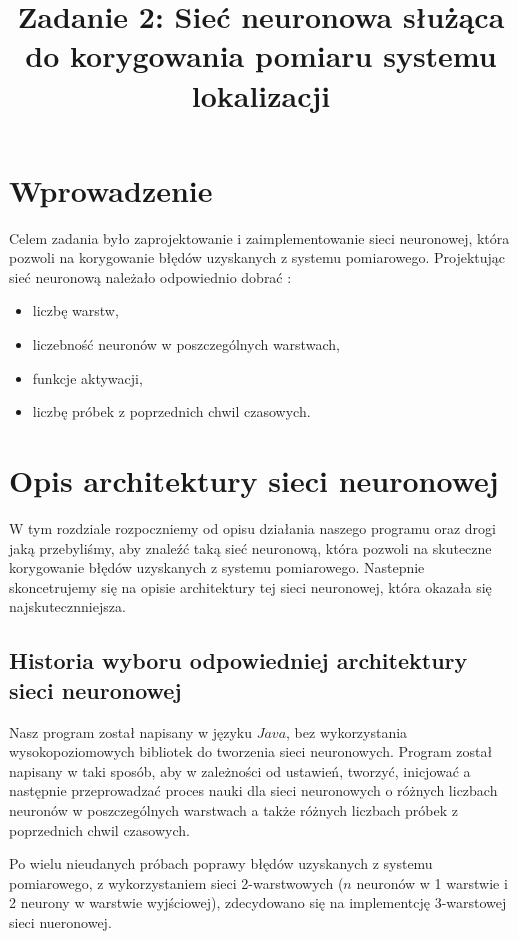 \documentclass{classrep}
\author{
\studentinfo{Mateusz Walczak}{216911} \and
\studentinfo{Konrad Kajszczak}{216790}
}
\title{Zadanie 2: Sieć neuronowa służąca do korygowania pomiaru systemu lokalizacji}
\begin{document}
\maketitle

\section*{Wprowadzenie}
Celem zadania było zaprojektowanie i zaimplementowanie sieci neuronowej, która pozwoli na korygowanie błędów uzyskanych z systemu pomiarowego. Projektując sieć neuronową należało odpowiednio dobrać \cite{zadanie}:

\begin{itemize}[label=$\bullet$\scshape\bfseries]
\item liczbę warstw,
\item liczebność neuronów w poszczególnych warstwach,
\item funkcje aktywacji,
\item liczbę próbek z poprzednich chwil czasowych.
\end{itemize}

\section{Opis architektury sieci neuronowej}

W tym rozdziale rozpoczniemy od opisu działania naszego programu oraz drogi jaką przebyliśmy, aby znaleźć taką sieć neuronową, która pozwoli na skuteczne korygowanie błędów uzyskanych z systemu pomiarowego. Nastepnie skoncetrujemy się na opisie architektury tej sieci neuronowej, która okazała się najskutecznniejsza. 

\subsection{Historia wyboru odpowiedniej architektury sieci neuronowej}

Nasz program został napisany w języku $Java$, bez wykorzystania wysokopoziomowych bibliotek do tworzenia sieci neuronowych.
Program został napisany w taki sposób, aby w zależności od ustawień, tworzyć, inicjować a następnie przeprowadzać proces nauki dla sieci neuronowych o różnych liczbach neuronów w poszczególnych warstwach a także różnych liczbach próbek z poprzednich chwil czasowych.\newline 

Po wielu nieudanych próbach poprawy błędów uzyskanych z systemu pomiarowego, z wykorzystaniem sieci 2-warstwowych ($n$ neuronów w 1 warstwie i 2 neurony w warstwie wyjściowej), zdecydowano się na implementcję 3-warstowej sieci nueronowej.\newline
\end{document}
